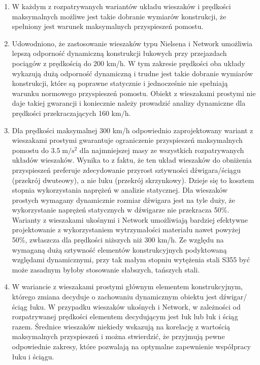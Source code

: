 \begin{enumerate}
	
\item W każdym z rozpatrywanych wariantów układu wieszaków i prędkości maksymalnych możliwe jest takie dobranie wymiarów konstrukcji, że spełniony jest warunek maksymalnych przyspieszeń pomostu.
	
\item Udowodniono, że zastosowanie wieszaków typu Nielsena i Network umożliwia lepszą odporność dynamiczną konstrukcji łukowych przy przejazdach pociągów z prędkością do 200 km/h. W tym zakresie prędkości oba układy wykazują dużą odporność dynamiczną i trudne jest takie dobranie wymiarów konstrukcji, które są poprawne statycznie i jednocześnie nie spełniają warunku normowego przyspieszeń pomostu. Obiekt z wieszakami prostymi nie daje takiej gwarancji i koniecznie należy prowadzić analizy dynamiczne dla prędkości przekraczających 160 km/h. 

\item Dla prędkości maksymalnej 300 km/h odpowiednio zaprojektowany wariant z wieszakami prostymi gwarantuje ograniczenie przyspieszeń maksymalnych pomostu do $3.5\;\mathrm{m/s^2}$ dla najmniejszej masy ze wszystkich rozpatrywanych układów wieszaków. Wynika to z faktu, że ten układ wieszaków do obniżenia przyspieszeń preferuje zdecydowanie przyrost sztywności dźwigara/ściągu (przekrój dwuteowy), a nie łuku (przekrój skrzynkowy). Dzieje się to kosztem stopnia wykorzystania naprężeń w analizie statycznej. Dla wieszaków prostych wymagany dynamicznie rozmiar dźwigara jest na tyle duży, że wykorzystanie naprężeń statycznych w dźwigarze nie przekracza 50\%. Warianty z wieszakami ukośnymi i Network umożliwiają bardziej efektywne projektowanie z wykorzystaniem wytrzymałości materiału nawet powyżej 50\%, zwłaszcza dla prędkości niższych niż 300 km/h. Ze względu na wymaganą dużą sztywność elementów konstrukcyjnych podyktowaną względami dynamicznymi, przy tak małym stopniu wytężenia stali S355 być może zasadnym byłoby stosowanie słabszych, tańszych stali.

\item W wariancie z wieszakami prostymi głównym elementem konstrukcyjnym, którego zmiana decyduje o zachowaniu dynamicznym obiektu jest dźwigar/ściąg łuku. W przypadku wieszaków ukośnych i Network, w zależności od rozpatrywanej prędkości elementem decydującym jest łuk lub łuk i ściąg razem. Średnice wieszaków niekiedy wskazują na korelację z wartością maksymalnych przyspieszeń i można stwierdzić, że przyjmują pewne odpowiednie zakresy, które pozwalają na optymalne zapewnienie współpracy łuku i ściągu.


\end{enumerate}
